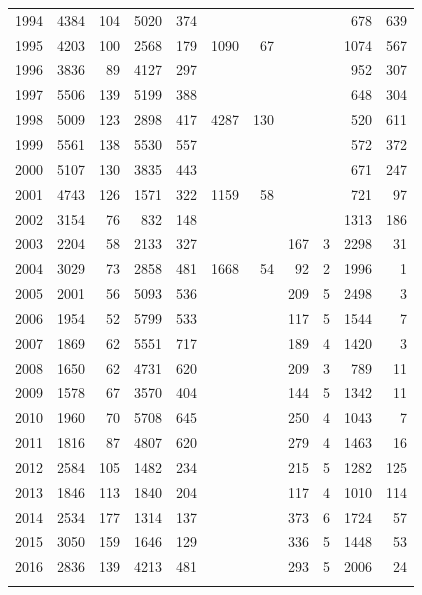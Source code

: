 \documentclass[12pt,]{article}
\begin{document}
\begin{longtable}{rrrrrrrrrrr}
  1994 & 4384 &  104 & 5020 &  374 &  &  &  &  &  678 &  639 \\ 
  1995 & 4203 &  100 & 2568 &  179 & 1090 &   67 &  &  & 1074 &  567 \\ 
  1996 & 3836 &   89 & 4127 &  297 &  &  &  &  &  952 &  307 \\ 
  1997 & 5506 &  139 & 5199 &  388 &  &  &  &  &  648 &  304 \\ 
  1998 & 5009 &  123 & 2898 &  417 & 4287 &  130 &  &  &  520 &  611 \\ 
  1999 & 5561 &  138 & 5530 &  557 &  &  &  &  &  572 &  372 \\ 
  2000 & 5107 &  130 & 3835 &  443 &  &  &  &  &  671 &  247 \\ 
  2001 & 4743 &  126 & 1571 &  322 & 1159 &   58 &  &  &  721 &   97 \\ 
  2002 & 3154 &   76 &  832 &  148 &  &  &  &  & 1313 &  186 \\ 
  2003 & 2204 &   58 & 2133 &  327 &  &  &  167 &    3 & 2298 &   31 \\ 
  2004 & 3029 &   73 & 2858 &  481 & 1668 &   54 &   92 &    2 & 1996 &    1 \\ 
  2005 & 2001 &   56 & 5093 &  536 &  &  &  209 &    5 & 2498 &    3 \\ 
  2006 & 1954 &   52 & 5799 &  533 &  &  &  117 &    5 & 1544 &    7 \\ 
  2007 & 1869 &   62 & 5551 &  717 &  &  &  189 &    4 & 1420 &    3 \\ 
  2008 & 1650 &   62 & 4731 &  620 &  &  &  209 &    3 &  789 &   11 \\ 
  2009 & 1578 &   67 & 3570 &  404 &  &  &  144 &    5 & 1342 &   11 \\ 
  2010 & 1960 &   70 & 5708 &  645 &  &  &  250 &    4 & 1043 &    7 \\ 
  2011 & 1816 &   87 & 4807 &  620 &  &  &  279 &    4 & 1463 &   16 \\ 
  2012 & 2584 &  105 & 1482 &  234 &  &  &  215 &    5 & 1282 &  125 \\ 
  2013 & 1846 &  113 & 1840 &  204 &  &  &  117 &    4 & 1010 &  114 \\ 
  2014 & 2534 &  177 & 1314 &  137 &  &  &  373 &    6 & 1724 &   57 \\ 
  2015 & 3050 &  159 & 1646 &  129 &  &  &  336 &    5 & 1448 &   53 \\ 
  2016 & 2836 &  139 & 4213 &  481 &  &  &  293 &    5 & 2006 &   24 \\ 
   \hline
\hline
\label{tab:Northern_length}
\end{longtable}
\end{document}
